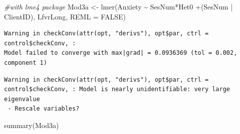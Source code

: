 \documentclass[
  english,
]{book}
\newenvironment{Shaded}{\begin{snugshade}}{\end{snugshade}}
\newcommand{\AttributeTok}[1]{\textcolor[rgb]{0.77,0.63,0.00}{#1}}
\newcommand{\CommentTok}[1]{\textcolor[rgb]{0.56,0.35,0.01}{\textit{#1}}}
\newcommand{\ConstantTok}[1]{\textcolor[rgb]{0.00,0.00,0.00}{#1}}
\newcommand{\FunctionTok}[1]{\textcolor[rgb]{0.00,0.00,0.00}{#1}}
\newcommand{\NormalTok}[1]{#1}
\newcommand{\OtherTok}[1]{\textcolor[rgb]{0.56,0.35,0.01}{#1}}
\newcommand{\SpecialCharTok}[1]{\textcolor[rgb]{0.00,0.00,0.00}{#1}}
\begin{document}
\begin{Shaded}
\begin{Highlighting}[]
\CommentTok{\#with lme4 package}
\NormalTok{Mod3a }\OtherTok{\textless{}{-}} \FunctionTok{lmer}\NormalTok{(Anxiety }\SpecialCharTok{\textasciitilde{}}\NormalTok{ SesNum}\SpecialCharTok{*}\NormalTok{Het0 }\SpecialCharTok{+}\NormalTok{(SesNum }\SpecialCharTok{|}\NormalTok{ ClientID), LfvrLong, }\AttributeTok{REML =} \ConstantTok{FALSE}\NormalTok{)}
\end{Highlighting}
\end{Shaded}

\begin{verbatim}
Warning in checkConv(attr(opt, "derivs"), opt$par, ctrl = control$checkConv, :
Model failed to converge with max|grad| = 0.0936369 (tol = 0.002, component 1)
\end{verbatim}

\begin{verbatim}
Warning in checkConv(attr(opt, "derivs"), opt$par, ctrl = control$checkConv, : Model is nearly unidentifiable: very large eigenvalue
 - Rescale variables?
\end{verbatim}

\begin{Shaded}
\begin{Highlighting}[]
\FunctionTok{summary}\NormalTok{(Mod3a)}
\end{Highlighting}
\end{Shaded}
\end{document}
